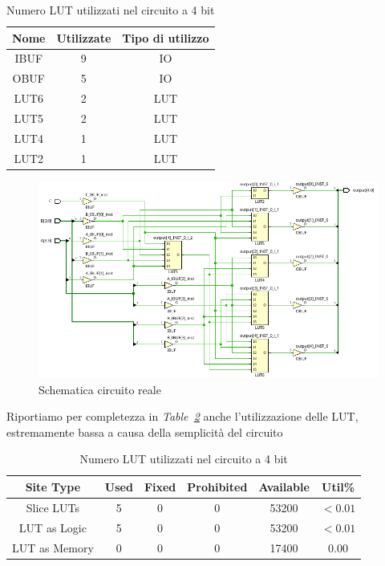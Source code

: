 \begin{table}[ht]
      \centering
      \begin{tabular}{|c|c|c|}
        \hline
        Nome & Utilizzate & Tipo di utilizzo \\ \hline
        IBUF & 9 & IO \\ \hline
        OBUF & 5 & IO \\ \hline
        LUT6 & 2 & LUT \\ \hline
        LUT5 & 2 & LUT \\ \hline
        LUT4 & 1 & LUT \\ \hline
        LUT2 & 1 & LUT \\ \hline 
      \end{tabular}
      \caption{Numero LUT utilizzati nel circuito a 4 bit}
      \label{lut_quantity_4bit}
\end{table}
\begin{figure}[ht]
  \centering
  \includegraphics[width=1\textwidth]{assets/LUT/4bit/LUT_schematic_4bit.png}
  \caption{Schematica circuito reale}
  \label{lut_schematic_4bit} 
\end{figure}

Riportiamo per completezza in \textit{Table~\ref{lut_utilization_4bit}} anche l'utilizzazione delle LUT, estremamente bassa a causa della semplicità del circuito
\begin{table}[ht]
      \centering
      \begin{tabular}{|c|c|c|c|c|c|}
        \hline
        Site Type & Used & Fixed & Prohibited & Available & Util\% \\ \hline
        Slice LUTs & 5 & 0 & 0 & 53200 & $<0.01$ \\ \hline
         LUT as Logic & 5 & 0 & 0 & 53200 & $<0.01$ \\ \hline 
         LUT as Memory  & 0 & 0 & 0 & 17400 & $0.00$ \\ \hline
      \end{tabular}
      \caption{Numero LUT utilizzati nel circuito a 4 bit}
      \label{lut_utilization_4bit}
\end{table}
\FloatBarrier

